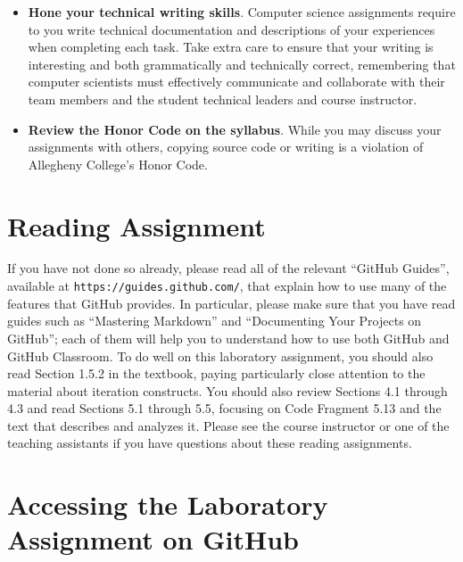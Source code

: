 \documentclass[11pt]{article}
\newcommand{\url}[1]{\lstinline{#1}}
\begin{document}
\begin{itemize}
\item {\bf Hone your technical writing skills}. Computer science assignments
  require to you write technical documentation and descriptions of your
  experiences when completing each task. Take extra care to ensure that your
  writing is interesting and both grammatically and technically correct,
  remembering that computer scientists must effectively communicate and
  collaborate with their team members and the student technical leaders and
  course instructor.

\item {\bf Review the Honor Code on the syllabus}. While you may discuss your
  assignments with others, copying source code or writing is a violation of
  Allegheny College's Honor Code.

\end{itemize}


\section*{Reading Assignment}

If you have not done so already, please read all of the relevant ``GitHub
Guides'', available at \url{https://guides.github.com/}, that explain how to use
many of the features that GitHub provides. In particular, please make sure that
you have read guides such as ``Mastering Markdown'' and ``Documenting Your
Projects on GitHub''; each of them will help you to understand how to use both
GitHub and GitHub Classroom. To do well on this laboratory assignment, you
should also read Section 1.5.2 in the textbook, paying particularly close
attention to the material about iteration constructs. You should also review
Sections 4.1 through 4.3 and read Sections 5.1 through 5.5, focusing on Code
Fragment 5.13 and the text that describes and analyzes it. Please see the course
instructor or one of the teaching assistants if you have questions about these
reading assignments.

\section*{Accessing the Laboratory Assignment on GitHub}
\end{document}
